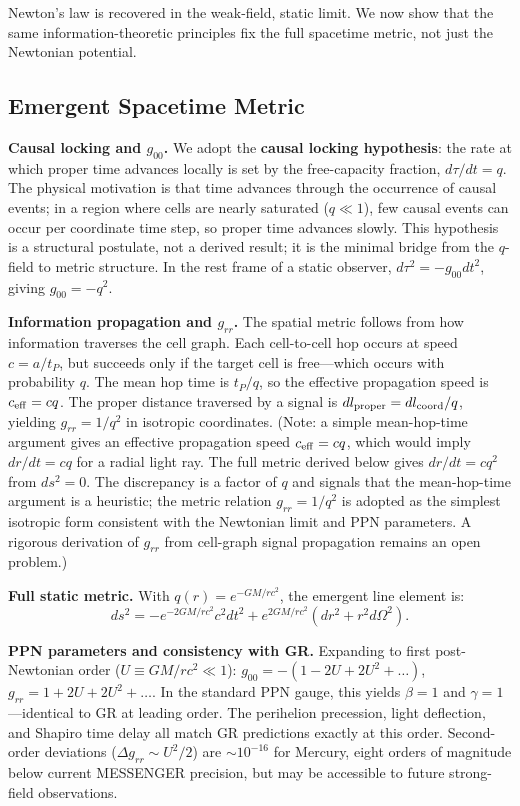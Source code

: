 \documentclass[aps,prd,twocolumn,showpacs,superscriptaddress,preprintnumbers]{revtex4-2}
\begin{document}
Newton's law is recovered in the weak-field, static limit.
We now show that the same information-theoretic principles fix the full spacetime metric, not just the Newtonian potential.

\subsection{Emergent Spacetime Metric}

\textbf{Causal locking and $g_{00}$.}
We adopt the \textbf{causal locking hypothesis}: the rate at which proper time advances locally is set by the free-capacity fraction, $d\tau/dt = q$. The physical motivation is that time advances through the occurrence of causal events; in a region where cells are nearly saturated ($q \ll 1$), few causal events can occur per coordinate time step, so proper time advances slowly. This hypothesis is a structural postulate, not a derived result; it is the minimal bridge from the $q$-field to metric structure.
In the rest frame of a static observer, $d\tau^2 = -g_{00}dt^2$, giving $g_{00} = -q^2$.

\textbf{Information propagation and $g_{rr}$.}
The spatial metric follows from how information traverses the cell graph.
Each cell-to-cell hop occurs at speed $c = a/t_P$, but succeeds only if the target cell is free---which occurs with probability $q$.
The mean hop time is $t_P/q$, so the effective propagation speed is $c_{\rm eff} = c q$.
The proper distance traversed by a signal is $dl_{\rm proper} = dl_{\rm coord}/q$, yielding $g_{rr} = 1/q^2$ in isotropic coordinates. (Note: a simple mean-hop-time argument gives an effective propagation speed $c_{\rm eff} = c q$, which would imply $dr/dt = c q$ for a radial light ray. The full metric derived below gives $dr/dt = c q^2$ from $ds^2=0$. The discrepancy is a factor of $q$ and signals that the mean-hop-time argument is a heuristic; the metric relation $g_{rr}=1/q^2$ is adopted as the simplest isotropic form consistent with the Newtonian limit and PPN parameters. A rigorous derivation of $g_{rr}$ from cell-graph signal propagation remains an open problem.)

\textbf{Full static metric.}
With $q(r) = e^{-GM/rc^2}$, the emergent line element is:
\begin{equation}
\boxed{ds^2 = -e^{-2GM/rc^2}c^2dt^2 + e^{2GM/rc^2}(dr^2 + r^2d\Omega^2)}.
\label{eq:metric}
\end{equation}

\textbf{PPN parameters and consistency with GR.}
Expanding to first post-Newtonian order ($U \equiv GM/rc^2 \ll 1$):
$g_{00} = -(1 - 2U + 2U^2 + \ldots)$, $g_{rr} = 1 + 2U + 2U^2 + \ldots$.
In the standard PPN gauge, this yields $\beta = 1$ and $\gamma = 1$---identical to GR at leading order.
The perihelion precession, light deflection, and Shapiro time delay all match GR predictions exactly at this order.
Second-order deviations ($\Delta g_{rr} \sim U^2/2$) are $\sim10^{-16}$ for Mercury, eight orders of magnitude below current MESSENGER precision, but may be accessible to future strong-field observations.
\end{document}
